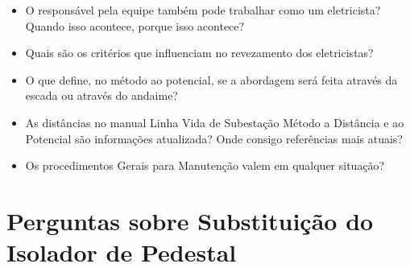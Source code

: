 \begin{itemize}
    \item O responsável pela equipe também pode trabalhar como um eletricista? Quando isso acontece, porque isso acontece?
    \item Quais são os critérios que influenciam no revezamento dos eletricistas? 
    \item O que define, no método ao potencial, se a abordagem será feita através da escada ou através do andaime?
    \item As distâncias no manual Linha Vida de Subestação Método a Distância e ao Potencial são informações atualizada? Onde consigo referências mais atuais? 
    \item Os procedimentos Gerais para Manutenção valem em qualquer situação?
\end{itemize}


\section{Perguntas sobre Substituição do Isolador de Pedestal}

